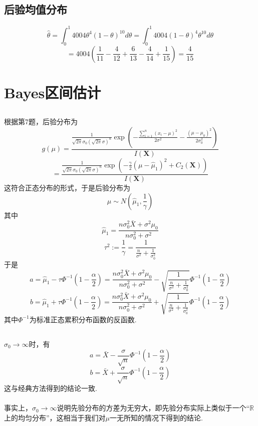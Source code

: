 \documentclass{article}
\begin{document}
\begin{CJK}{UTF8}{gbsn}
\subsection{后验均值分布}
$$\hat{\theta}=\int_{0}^{1}4004\theta^{4}(1-\theta)^{10}d\theta=\int_{0}^{1}4004(1-\theta)^{4}\theta^{10}d\theta$$
$$=4004(\frac{1}{11}-\frac{4}{12}+\frac{6}{13}-\frac{4}{14}+\frac{1}{15})=\frac{4}{15}$$
\section{Bayes区间估计}
\subsection{}
根据第7题，后验分布为
$$ g(\mu)=\frac{\frac{1}{\sqrt{2\pi}\sigma_{0}(\sqrt{2\pi}\sigma)^{n}}\exp(-\frac{\sum\limits_{i=1}^{n}(x_{i}-\mu)^{2}}{2\sigma^{2}}-\frac{(\mu-\mu_{0})^{2}}{2\sigma_{0}^{2}})}{I(\mathbf{X})}$$
$$ =\frac{\frac{1}{\sqrt{2\pi}\sigma_{0}(\sqrt{2\pi}\sigma)^{n}}\exp(-\frac{\gamma}{2}(\mu-\hat{\mu}_{1})^{2}+C_{2}(\mathbf{X}))}{I(\mathbf{X})}$$
这符合正态分布的形式，于是后验分布为
$$ \mu \sim N(\hat{\mu}_{1},\frac{1}{\gamma})$$
其中
$$ \hat{\mu}_{1}=\frac{n\sigma_{0}^{2}\bar{X}+\sigma^{2}\mu_{0}}{n\sigma_{0}^{2}+\sigma^{2}}$$
$$ \tau^{2}:=\frac{1}{\gamma} = \frac{1}{\frac{n}{\sigma^{2}}+\frac{1}{\sigma_{0}^{2}}}$$
于是
$$ a=\hat{\mu}_{1}-\tau\Phi^{-1}(1-\frac{\alpha}{2})=\frac{n\sigma_{0}^{2}\bar{X}+\sigma^{2}\mu_{0}}{n\sigma_{0}^{2}+\sigma^{2}}-\sqrt{\frac{1}{\frac{n}{\sigma^{2}}+\frac{1}{\sigma_{0}^{2}}}}\Phi^{-1}(1-\frac{\alpha}{2})$$
$$ b=\hat{\mu}_{1}+\tau\Phi^{-1}(1-\frac{\alpha}{2})=\frac{n\sigma_{0}^{2}\bar{X}+\sigma^{2}\mu_{0}}{n\sigma_{0}^{2}+\sigma^{2}}+\sqrt{\frac{1}{\frac{n}{\sigma^{2}}+\frac{1}{\sigma_{0}^{2}}}}\Phi^{-1}(1-\frac{\alpha}{2})$$
其中$\Phi^{-1}$为标准正态累积分布函数的反函数.
\subsection{}
$\sigma_{0}\to\infty$时，有
$$ a=\bar{X}-\frac{\sigma}{\sqrt{n}}\Phi^{-1}(1-\frac{\alpha}{2})$$
$$ b=\bar{X}+\frac{\sigma}{\sqrt{n}}\Phi^{-1}(1-\frac{\alpha}{2})$$
这与经典方法得到的结论一致.
\\\\
事实上，$\sigma_{0}\to\infty$说明先验分布的方差为无穷大，即先验分布实际上类似于一个“$\mathbb{R}$上的均匀分布”，这相当于我们对$\mu$一无所知的情况下得到的结论.

\end{CJK}
\end{document}
